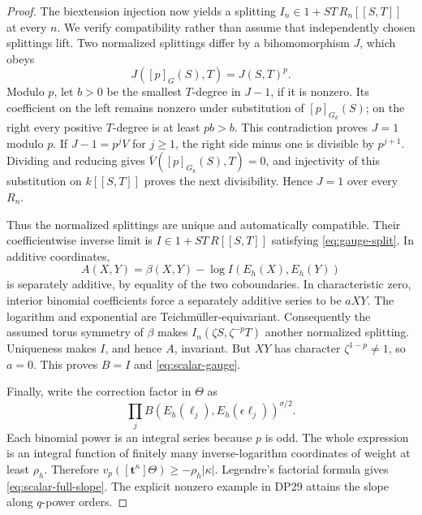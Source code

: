 \begin{proof}
The biextension injection now yields a splitting $I_n\in1+ST\,R_n[[S,T]]$ at every $n$. We verify compatibility rather than assume that independently chosen splittings lift. Two normalized splittings differ by a bihomomorphism $J$, which obeys
\[
 J([p]_G(S),T)=J(S,T)^p.
\]
Modulo $p$, let $b>0$ be the smallest $T$-degree in $J-1$, if it is nonzero. Its coefficient on the left remains nonzero under substitution of $[p]_{G_k}(S)$; on the right every positive $T$-degree is at least $pb>b$. This contradiction proves $J=1$ modulo $p$. If $J-1=p^jV$ for $j\ge1$, the right side minus one is divisible by $p^{j+1}$. Dividing and reducing gives $\bar V([p]_{G_k}(S),T)=0$, and injectivity of this substitution on $k[[S,T]]$ proves the next divisibility. Hence $J=1$ over every $R_n$.

Thus the normalized splittings are unique and automatically compatible. Their coefficientwise inverse limit is $I\in1+ST\,R[[S,T]]$ satisfying \eqref{eq:gauge-split}. In additive coordinates,
\[
 A(X,Y)=\beta(X,Y)-\log I(E_h(X),E_h(Y))
\]
is separately additive, by equality of the two coboundaries. In characteristic zero, interior binomial coefficients force a separately additive series to be $aXY$. The logarithm and exponential are Teichm\"uller-equivariant. Consequently the assumed torus symmetry of $\beta$ makes $I_n(\zeta S,\zeta^{-p}T)$ another normalized splitting. Uniqueness makes $I$, and hence $A$, invariant. But $XY$ has character $\zeta^{1-p}\ne1$, so $a=0$. This proves $B=I$ and \eqref{eq:scalar-gauge}.

Finally, write the correction factor in $\Theta$ as
\[
 \prod_j B(E_h(\ell_j),E_h(\epsilon\ell_j))^{\sigma/2}.
\]
Each binomial power is an integral series because $p$ is odd. The whole expression is an integral function of finitely many inverse-logarithm coordinates of weight at least $\rho_h$. Therefore $v_p([\mathbf t^\kappa]\Theta)\ge-\rho_h|\kappa|$. Legendre's factorial formula gives \eqref{eq:scalar-full-slope}. The explicit nonzero example in DP29 attains the slope along $q$-power orders.
\end{proof}

